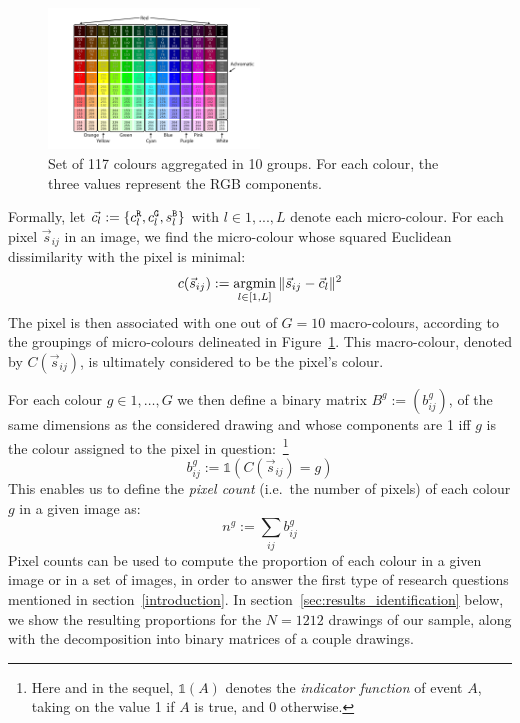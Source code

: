 \documentclass[11pt,a4paper]{article}
\begin{document}
\begin{figure}
	\centering
	\includegraphics[width=0.5\textwidth]{figures/Col_tab.pdf}
	\caption{Set of 117 colours aggregated in 10 groups. For each colour, the three values represent the RGB components. \label{fig:colour_set}}
\end{figure}

Formally, let \(\vec{c_l} := \{ c^{\tt \scriptstyle R}_{l}, c^{\tt \scriptstyle G}_{l}, s^{\tt \scriptstyle B}_{l} \}\) with $l \in 1, ..., L$ denote each micro-colour. For each pixel \(\vec{s}_{ij}\) in an image, we find the micro-colour whose squared Euclidean dissimilarity with the pixel is minimal:
\begin{equation}
c(\vec{s}_{ij}) := \operatornamewithlimits{argmin}_{l \in [1,L]} \| \vec{s}_{ij} - \vec{c}_{l} \|^{2}
\label{eq_micro_col}
\end{equation}
The pixel is then associated with one out of $G = 10$ macro-colours, according to the groupings of micro-colours delineated in Figure~\ref{fig:colour_set}. This macro-colour, denoted by $C(\vec{s}_{ij})$, is ultimately considered to be the pixel's colour.

For each colour $g\in 1, \dots, G$ we then define a binary matrix $B^{g} := (b_{ij}^{g})$, of the same dimensions as the considered drawing and whose components are 1 iff $g$ is the colour assigned to the pixel in question:~\footnote{Here and in the sequel, $\mathds{1}(A)$ denotes the \textit{indicator function} of event $A$, taking on the value 1 if $A$ is true, and 0 otherwise.}
\begin{equation}
	b_{ij}^{g} := \mathds{1}(C(\vec{s}_{ij}) = g)
\end{equation}
This enables us to define the \textit{pixel count} (i.e.~the number of pixels) of each colour $g$ in a given image as:
\begin{equation}
	n^{g} := \sum_{ij}b_{ij}^{g}
\end{equation}
Pixel counts can be used to compute the proportion of each colour in a given image or in a set of images, in order to answer the first type of research questions mentioned in section~\ref{introduction}. In section~\ref{sec:results_identification} below, we show the resulting proportions for the $N = 1212$ drawings of our sample, along with the decomposition into binary matrices of a couple drawings.
\end{document}
